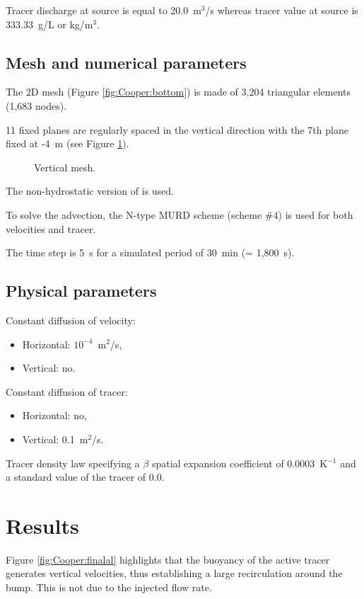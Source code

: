 Tracer discharge at source is equal to 20.0~m$^3$/s whereas tracer value at
source is 333.33~g/L or kg/m$^3$.

\subsection{Mesh and numerical parameters}

The 2D mesh (Figure \ref{fig:Cooper:bottom})
is made of 3,204 triangular elements (1,683 nodes).

11 fixed planes are regularly spaced in the vertical direction
with the 7th plane fixed at -4~m
(see Figure \ref{fig:Cooper:meshV}).

\begin{figure}[H]
 \centering
{}
 \caption{Vertical mesh.}\label{fig:Cooper:meshV}
\end{figure}

The non-hydrostatic version of  is used.

To solve the advection, the N-type MURD scheme (scheme \#4) is used for both
velocities and tracer.

The time step is 5~s for a simulated period of 30~min (= 1,800~s).

\subsection{Physical parameters}

Constant diffusion of velocity:
\begin{itemize}
\item Horizontal: $10^{-4}$~m$^2$/s,
\item Vertical: no.
\end{itemize}
Constant diffusion of tracer: 
\begin{itemize}
\item Horizontal: no,
\item Vertical: 0.1~m$^2$/s.
\end{itemize}
Tracer density law specifying a $\beta$ spatial expansion coefficient of
0.0003~K$^{-1}$ and a standard value of the tracer of 0.0.\\

\section{Results}

Figure \ref{fig:Cooper:finalal} highlights that the buoyancy of the active
tracer generates vertical velocities,
thus establishing a large recirculation around the bump.
This is not due to the injected flow rate.

